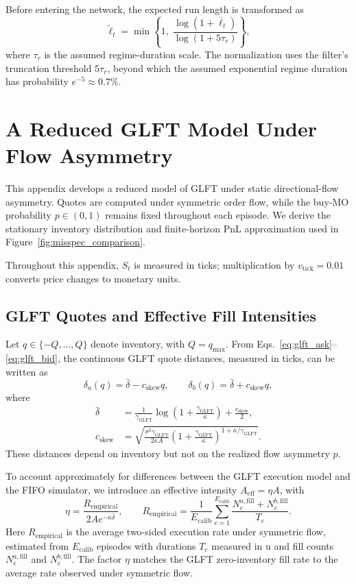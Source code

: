 \documentclass[11pt,a4paper]{article}
\begin{document}
Before entering the network, the expected run length
is transformed as
\[
  \widetilde{\ell}_t
  =
  \min\left\{
    1,\;
    \frac{\log(1+\bar{\ell}_t)}
         {\log(1+5\tau_r)}
  \right\},
\]
where $\tau_r$ is the assumed regime-duration scale.
The normalization uses the filter's truncation
threshold $5\tau_r$, beyond which the assumed
exponential regime duration has probability
$e^{-5}\approx0.7\%$.


\section{A Reduced GLFT Model Under Flow Asymmetry}
\label{app:glft_misspecification}

This appendix develops a reduced model of GLFT under
static directional-flow asymmetry. Quotes are computed
under symmetric order flow, while the buy-MO probability
$p\in(0,1)$ remains fixed throughout each episode.
We derive the stationary inventory distribution and
finite-horizon PnL approximation used in
Figure~\ref{fig:misspec_comparison}.

Throughout this appendix, $S_t$ is measured in ticks;
multiplication by $v_{\mathrm{tick}}=0.01$ converts price
changes to monetary units.

\subsection{GLFT Quotes and Effective Fill Intensities}

Let $q\in\{-Q,\ldots,Q\}$ denote inventory, with
$Q=q_{\max}$. From
Eqs.~\eqref{eq:glft_ask}--\eqref{eq:glft_bid},
the continuous GLFT quote distances, measured in ticks,
can be written as
\[
  \delta_a(q)=\bar\delta-c_{\mathrm{skew}}q,
  \qquad
  \delta_b(q)=\bar\delta+c_{\mathrm{skew}}q,
\]
where
\[
  \begin{aligned}
  \bar\delta
  &=
  \frac{1}{\gamma_{\mathrm{GLFT}}}
  \log\left(1+\frac{\gamma_{\mathrm{GLFT}}}{\kappa}\right)
  +\frac{c_{\mathrm{skew}}}{2},
  \\[4pt]
  c_{\mathrm{skew}}
  &=
  \sqrt{
    \frac{\sigma^2\gamma_{\mathrm{GLFT}}}{2\kappa A}
    \left(1+\frac{\gamma_{\mathrm{GLFT}}}{\kappa}\right)^{
    1+\kappa/\gamma_{\mathrm{GLFT}}}
  }.
  \end{aligned}
\]
These distances depend on inventory but not on
the realized flow asymmetry $p$.

To account approximately for differences between
the GLFT execution model and the FIFO simulator,
we introduce an effective intensity
$A_{\mathrm{eff}}=\eta A$, with
\[
  \eta
  =
  \frac{R_{\mathrm{empirical}}}
       {2Ae^{-\kappa\bar\delta}},
  \qquad
  R_{\mathrm{empirical}}
  =
  \frac{1}{E_{\mathrm{calib}}}
  \sum_{e=1}^{E_{\mathrm{calib}}}
  \frac{
    N_e^{a,\mathrm{fill}}+N_e^{b,\mathrm{fill}}
  }{T_e}.
\]
Here $R_{\mathrm{empirical}}$ is the average
two-sided execution rate under symmetric flow,
estimated from $E_{\mathrm{calib}}$ episodes
with durations $T_e$ measured in $\mathrm{u}$ and fill counts
$N_e^{a,\mathrm{fill}}$ and $N_e^{b,\mathrm{fill}}$.
The factor $\eta$ matches the GLFT zero-inventory
fill rate to the average rate observed under symmetric flow.
\end{document}

